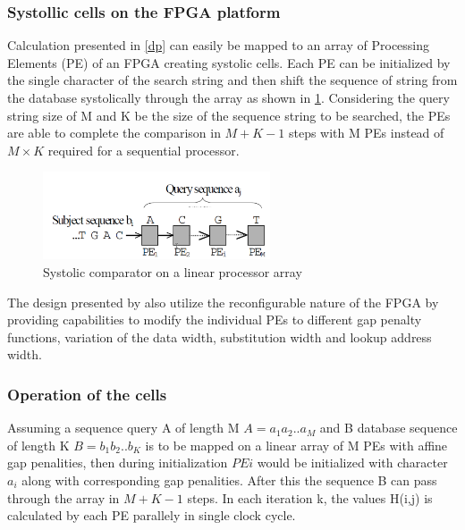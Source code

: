 \documentclass[12pt,twoside]{article}
\begin{document}
\subsubsection{Systollic cells on the FPGA platform}

Calculation presented in \cref{dp} can easily be mapped to an array of Processing Elements (PE) of an FPGA creating systolic cells.
Each PE can be initialized by the single character of the search string and then shift the sequence of string from the database systolically
through the array as shown in \cref{fig:systollicarray}. Considering the query string size of M and K be the size of the sequence string to be
searched, the PEs are able to complete the comparison in $ M + K-1 $ steps with M PEs instead of $ M \times K $ required for a sequential processor.

\begin{figure}%
    \centering
    \includegraphics[width=0.6\textwidth]{fig/systollicarray}
    \caption{Systolic comparator on a linear processor array \cite[Figure 2]{oliver_hyper_2005}}
    \label{fig:systollicarray}
\end{figure}

The design presented by \textcite{oliver_hyper_2005} also utilize the reconfigurable nature of the FPGA by providing capabilities to modify the 
individual PEs to different gap penalty functions, variation of the data width, substitution width and lookup address width. 

\subsubsection{Operation of the cells}

Assuming a sequence query A of length M $ A = a_1a_2 .. a_M $ and B database sequence of length K $B = b_1b_2 .. b_K $ is to be mapped on a linear array of
M PEs with affine gap penalities, then during initialization $ PE i $ would be initialized with character $ a_i $ along with corresponding
gap penalities. After this the sequence B can pass through the array in $M+K-1$ steps. In each iteration k, the values H(i,j) is calculated by
each PE parallely in single clock cycle. 
\end{document}
